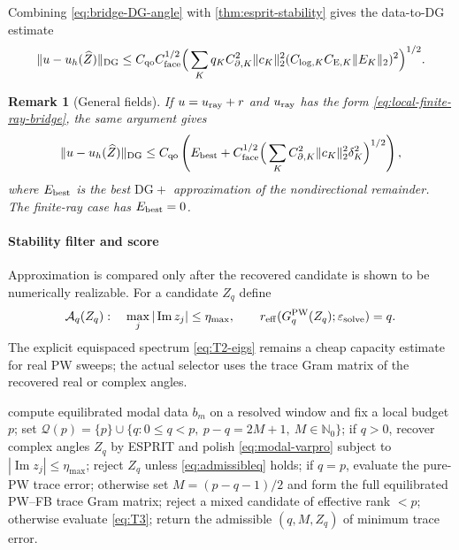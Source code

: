 \documentclass[11pt]{article}
\newtheorem{remark}[theorem]{Remark}
\newcommand{\PW}{\mathrm{PW}}
\renewcommand{\Im}{\operatorname{Im}}
\numberwithin{equation}{section}
\begin{document}
Combining \eqref{eq:bridge-DG-angle} with \cref{thm:esprit-stability} gives the data-to-DG estimate
\begin{equation}\label{eq:bridge-DG-hankel}
 \|u-u_h(\widehat Z)\|_{\mathrm{DG}}
 \le C_{\mathrm{qo}}C_{\rm face}^{1/2}
 \Big(\sum_K q_K C_{\partial,K}^2\|c_K\|_2^2
 (C_{\log,K}C_{{\rm E},K}\|E_K\|_2)^2\Big)^{1/2}.
\end{equation}

\begin{remark}[General fields]\label{rem:bridge-general}
If $u=u_{\rm ray}+r$ and $u_{\rm ray}$ has the form \eqref{eq:local-finite-ray-bridge}, the same argument gives
\[
 \|u-u_h(\widehat Z)\|_{\mathrm{DG}}
 \le C_{\mathrm{qo}}\left(E_{\rm best}
 +C_{\rm face}^{1/2}
 \Big(\sum_K C_{\partial,K}^2\|c_K\|_2^2\delta_K^2\Big)^{1/2}\right),
\]
where $E_{\rm best}$ is the best $\mathrm{DG}+$ approximation of the nondirectional remainder.  The finite-ray case has $E_{\rm best}=0$.
\end{remark}

\paragraph{Stability filter and score}
Approximation is compared only after the recovered candidate is shown to be numerically realizable.  For a candidate $Z_q$ define
\begin{equation}\label{eq:admissibleq}
 \mathcal A_q(Z_q):\quad
 \max_j|\Im z_j|\le\eta_{\max},\qquad
 r_{\rm eff}(G_q^{\PW}(Z_q);\varepsilon_{\rm solve})=q.
\end{equation}
The explicit equispaced spectrum \eqref{eq:T2-eigs} remains a cheap capacity estimate for real PW sweeps; the actual selector uses the trace Gram matrix of the recovered real or complex angles.

\begin{algorithm}[H]
\caption{Stability-aware local PW--FB selection}\label{alg:selector}
\begin{algorithmic}[1]
\State compute equilibrated modal data $b_m$ on a resolved window and fix a local budget $p$;
\State set $\mathcal Q(p)=\{p\}\cup\{q:0\le q<p,\ p-q=2M+1,\ M\in\mathbb N_0\}$;
 \State if $q>0$, recover complex angles $Z_q$ by ESPRIT and polish \eqref{eq:modal-varpro} subject to $|\Im z_j|\le\eta_{\max}$;
 \State reject $Z_q$ unless \eqref{eq:admissibleq} holds;
 \State if $q=p$, evaluate the pure-PW trace error; otherwise set $M=(p-q-1)/2$ and form the full equilibrated PW--FB trace Gram matrix;
 \State reject a mixed candidate of effective rank $<p$; otherwise evaluate \eqref{eq:T3};
\EndFor
\State return the admissible $(q,M,Z_q)$ of minimum trace error.
\end{algorithmic}
\end{algorithm}
\end{document}
